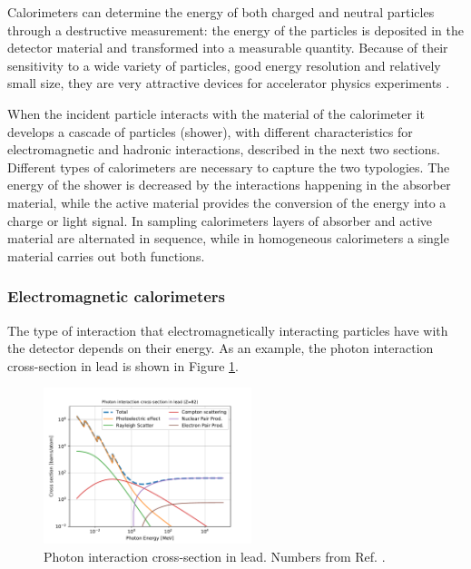 Calorimeters can determine the energy of both charged and neutral particles through a destructive measurement: the energy of the particles is deposited in the detector material and transformed into a measurable quantity. Because of their sensitivity to a wide variety of particles, good energy resolution and relatively small size, they are very attractive devices for accelerator physics experiments \cite{RevModPhys.75.1243,Wigmans:2000vf}.

When the incident particle interacts with the material of the calorimeter it develops a cascade of particles (shower), with different characteristics for electromagnetic and hadronic interactions, described in the next two sections. Different types of calorimeters are necessary to capture the two typologies. The energy of the shower is decreased by the interactions happening in the absorber material, while the active material provides the conversion of the energy into a charge or light signal. In sampling calorimeters layers of absorber and active material are alternated in sequence, while in homogeneous calorimeters a single material carries out both functions.


\subsubsection*{Electromagnetic calorimeters}

The type of interaction that electromagnetically interacting particles have with the detector depends on their energy. 
As an example, the photon interaction cross-section in lead is shown in Figure  \ref{fig:det:xsec_photon}. 

\begin{figure}[ht]
\centering
\includegraphics[width=0.54\textwidth]{figures/springer/photon_xsec.pdf}
\caption{Photon interaction cross-section in lead. Numbers from Ref. \cite{Patrignani:2016xqp}. }
\label{fig:det:xsec_photon}
\end{figure}

